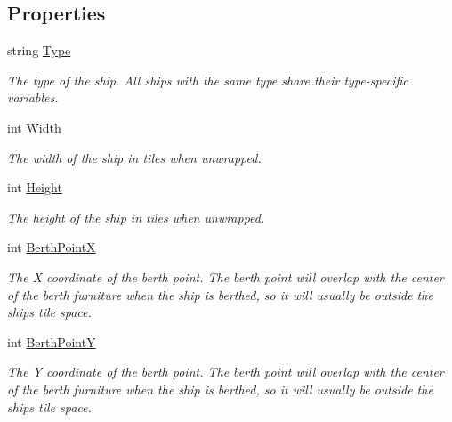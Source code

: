 \subsection*{Properties}
\begin{DoxyCompactItemize}
\item 
string \hyperlink{class_ship_a2248235d4add6f4f6b4aa2618a705372}{Type}
\begin{DoxyCompactList}\small\item\em The type of the ship. All ships with the same type share their type-\/specific variables. \end{DoxyCompactList}\item 
int \hyperlink{class_ship_a6c39fc4957664fabe750c64c057e2508}{Width}
\begin{DoxyCompactList}\small\item\em The width of the ship in tiles when unwrapped. \end{DoxyCompactList}\item 
int \hyperlink{class_ship_a5812d27ab513c99d41b7d232aa3bdd6d}{Height}
\begin{DoxyCompactList}\small\item\em The height of the ship in tiles when unwrapped. \end{DoxyCompactList}\item 
int \hyperlink{class_ship_a701af608a2094d00e59888170afcc3ce}{Berth\+PointX}
\begin{DoxyCompactList}\small\item\em The X coordinate of the berth point. The berth point will overlap with the center of the berth furniture when the ship is berthed, so it will usually be outside the ship\textquotesingle{}s tile space. \end{DoxyCompactList}\item 
int \hyperlink{class_ship_af57117a07b57f2b6764fd12e678f01ae}{Berth\+PointY}
\begin{DoxyCompactList}\small\item\em The Y coordinate of the berth point. The berth point will overlap with the center of the berth furniture when the ship is berthed, so it will usually be outside the ship\textquotesingle{}s tile space. \end{DoxyCompactList}\item 

\end{DoxyCompactItemize}
